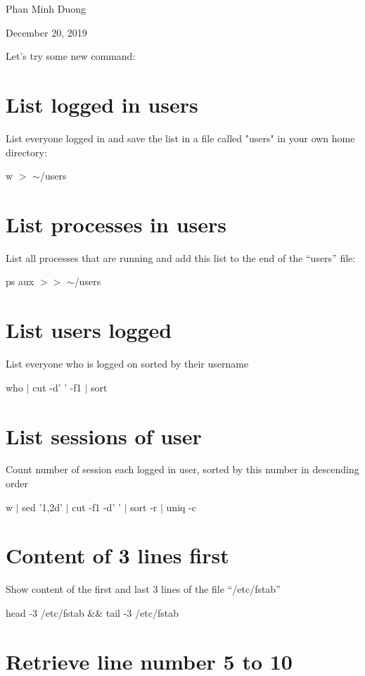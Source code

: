\documentclass[article, paper=a4, fontsize=11pt]{scrartcl}
\begin{document}
\begin{center}
Phan Minh Duong
\end{center}
\begin{center}
December 20, 2019
\end{center}

Let's try some new command:

\section{List logged in users}

List everyone logged in and save the list in a file called "users" in your own home directory:

w $>$ $ \sim$/users

\section{List processes in users}

List all processes that are running and add this list to the end of the “users” file:

ps  aux $>>$ $ \sim$/users

\section{List users logged }

List everyone who is logged on sorted by their username

who $\mid$  cut -d' ' -f1 $\mid$ sort

\section{List sessions of user }

Count number of session each logged in user, sorted by this number in descending order

w $\mid$ sed '1,2d' $\mid$ cut -f1 -d' ' $\mid$ sort -r $\mid$ uniq -c

\section{Content of 3 lines first}

Show content of the first and last 3 lines of the file “/etc/fstab”

head -3 /etc/fstab \&\&  tail -3 /etc/fstab

\section{Retrieve line number 5 to 10}
\end{document}
